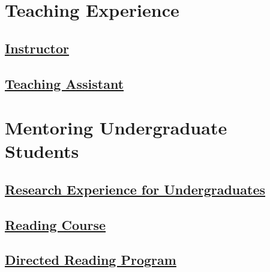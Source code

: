 \documentclass[11pt,letterpaper,roman]{moderncv} %
\newcommand{\mysubsection}[1]{\subsection{\underline{#1}}}
\newcounter{section} \setcounter{section}{1} \newtheorem{theorem}{Theorem}
\begin{document}
\section{Teaching Experience}

\newcommand{\teach}[4]{\cvitem{#3 #4}{#1 -- #2}}
\mysubsection{Instructor}


\mysubsection{Teaching Assistant}


\section{Mentoring Undergraduate Students}

\newcommand{\drp}[4]{\cvitem{#3 #4}{#1, \textit{#2}}}

\mysubsection{Research Experience for Undergraduates}


\mysubsection{Reading Course}


\mysubsection{Directed Reading Program}



% 
\end{document}
